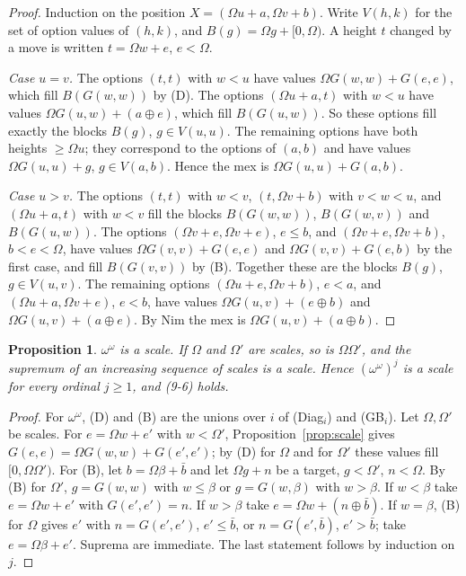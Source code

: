 \documentclass[11pt]{amsart}
\newtheorem{proposition}[theorem]{Proposition}
\theoremstyle{definition}
\theoremstyle{remark}
\newcommand{\G}{G}
\newcommand{\nim}{\oplus}
\begin{document}
\begin{proof}
Induction on the position $X=(\Omega u+a,\Omega v+b)$. Write $V(h,k)$ for the set of option
values of $(h,k)$, and $B(g)=\Omega g+[0,\Omega)$. A height $t$ changed by a move is written
$t=\Omega w+e$, $e<\Omega$.

\emph{Case $u=v$.} The options $(t,t)$ with $w<u$ have values $\Omega\G(w,w)+\G(e,e)$, which
fill $B(\G(w,w))$ by (D). The options $(\Omega u+a,t)$ with $w<u$ have values
$\Omega\G(u,w)+(a\nim e)$, which fill $B(\G(u,w))$. So these options fill exactly the blocks
$B(g)$, $g\in V(u,u)$. The remaining options have both heights $\ge\Omega u$; they correspond
to the options of $(a,b)$ and have values $\Omega\G(u,u)+g$, $g\in V(a,b)$. Hence the mex is
$\Omega\G(u,u)+\G(a,b)$.

\emph{Case $u>v$.} The options $(t,t)$ with $w<v$, $(t,\Omega v+b)$ with $v<w<u$, and
$(\Omega u+a,t)$ with $w<v$ fill the blocks $B(\G(w,w))$, $B(\G(w,v))$ and $B(\G(u,w))$. The
options $(\Omega v+e,\Omega v+e)$, $e\le b$, and $(\Omega v+e,\Omega v+b)$, $b<e<\Omega$, have
values $\Omega\G(v,v)+\G(e,e)$ and $\Omega\G(v,v)+\G(e,b)$ by the first case, and fill
$B(\G(v,v))$ by (B). Together these are the blocks $B(g)$, $g\in V(u,v)$. The remaining options
$(\Omega u+e,\Omega v+b)$, $e<a$, and $(\Omega u+a,\Omega v+e)$, $e<b$, have values
$\Omega\G(u,v)+(e\nim b)$ and $\Omega\G(u,v)+(a\nim e)$. By Nim the mex is
$\Omega\G(u,v)+(a\nim b)$.
\end{proof}

\begin{proposition}\label{prop:scales}
$\omega^\omega$ is a scale. If $\Omega$ and $\Omega'$ are scales, so is $\Omega\Omega'$, and the
supremum of an increasing sequence of scales is a scale. Hence $(\omega^\omega)^j$ is a scale
for every ordinal $j\ge1$, and \textup{(9-6)} holds.
\end{proposition}

\begin{proof}
For $\omega^\omega$, (D) and (B) are the unions over $i$ of (Diag$_i$) and (GB$_i$). Let
$\Omega,\Omega'$ be scales. For $e=\Omega w+e'$ with $w<\Omega'$,
Proposition~\ref{prop:scale} gives $\G(e,e)=\Omega\G(w,w)+\G(e',e')$; by (D) for $\Omega$ and
for $\Omega'$ these values fill $[0,\Omega\Omega')$. For (B), let $b=\Omega\beta+\bar b$ and let
$\Omega g+n$ be a target, $g<\Omega'$, $n<\Omega$. By (B) for $\Omega'$, $g=\G(w,w)$ with
$w\le\beta$ or $g=\G(w,\beta)$ with $w>\beta$. If $w<\beta$ take $e=\Omega w+e'$ with
$\G(e',e')=n$. If $w>\beta$ take $e=\Omega w+(n\nim\bar b)$. If $w=\beta$, (B) for $\Omega$ gives
$e'$ with $n=\G(e',e')$, $e'\le\bar b$, or $n=\G(e',\bar b)$, $e'>\bar b$; take
$e=\Omega\beta+e'$. Suprema are immediate. The last statement follows by induction on $j$.
\end{proof}
\end{document}
